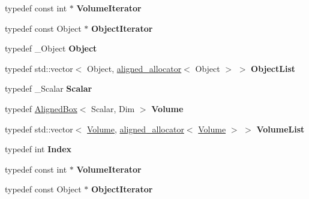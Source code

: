 \begin{DoxyCompactItemize}
typedef const int $\ast$ {\bfseries Volume\+Iterator}
\item 
\mbox{\label{class_eigen_1_1_kd_b_v_h_a0fa9dff0c7e6bad0ada6bcd7210cbc69}} 
typedef const Object $\ast$ {\bfseries Object\+Iterator}
\item 
\mbox{\label{class_eigen_1_1_kd_b_v_h_a5e7aa76dd924d1769a6553e01ad15465}} 
typedef \+\_\+\+Object {\bfseries Object}
\item 
\mbox{\label{class_eigen_1_1_kd_b_v_h_ae4959ded9043c983256243c96a70729b}} 
typedef std\+::vector$<$ Object, \hyperlink{group___core___module_class_eigen_1_1aligned__allocator}{aligned\+\_\+allocator}$<$ Object $>$ $>$ {\bfseries Object\+List}
\item 
\mbox{\label{class_eigen_1_1_kd_b_v_h_a9d6a9f44ab06e4de7710a16ddbf57d4d}} 
typedef \+\_\+\+Scalar {\bfseries Scalar}
\item 
\mbox{\label{class_eigen_1_1_kd_b_v_h_aa6dc4b3d16e0af79823b21ee3cd53c93}} 
typedef \hyperlink{group___geometry___module_class_eigen_1_1_aligned_box}{Aligned\+Box}$<$ Scalar, Dim $>$ {\bfseries Volume}
\item 
\mbox{\label{class_eigen_1_1_kd_b_v_h_a7dfb6a468c70f7e1a0a4e24303bdfb8a}} 
typedef std\+::vector$<$ \hyperlink{group___geometry___module_class_eigen_1_1_aligned_box}{Volume}, \hyperlink{group___core___module_class_eigen_1_1aligned__allocator}{aligned\+\_\+allocator}$<$ \hyperlink{group___geometry___module_class_eigen_1_1_aligned_box}{Volume} $>$ $>$ {\bfseries Volume\+List}
\item 
\mbox{\label{class_eigen_1_1_kd_b_v_h_ad856a9168aa72e090151bced902c24c6}} 
typedef int {\bfseries Index}
\item 
\mbox{\label{class_eigen_1_1_kd_b_v_h_ad1a43287b2997e922773789788a8fe95}} 
typedef const int $\ast$ {\bfseries Volume\+Iterator}
\item 
\mbox{\label{class_eigen_1_1_kd_b_v_h_a0fa9dff0c7e6bad0ada6bcd7210cbc69}} 
typedef const Object $\ast$ {\bfseries Object\+Iterator}
\end{DoxyCompactItemize}

